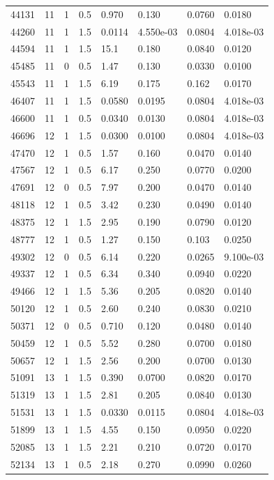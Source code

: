 \documentclass[preview]{standalone}
\begin{document}
{{{{{\begin{tabular}{L{1.2cm}C{1.2cm} C{0.3cm}C{0.5cm} C{1.4cm}C{1.4cm} C{1.4cm}C{1.4cm}}
  44131  &    11  & 1     & 0.5 &  0.970  & 0.130  & 0.0760 &  0.0180   \\ 
  44260  &    11  & 1     & 1.5 &  0.0114  & 4.550e-03  & 0.0804 &  4.018e-03   \\ 
  44594  &    11  & 1     & 1.5 &  15.1  & 0.180  & 0.0840 &  0.0120   \\ 
  45485  &    11  & 0     & 0.5 &  1.47  & 0.130  & 0.0330 &  0.0100   \\ 
  45543  &    11  & 1     & 1.5 &  6.19  & 0.175  & 0.162 &  0.0170   \\ 
  46407  &    11  & 1     & 1.5 &  0.0580  & 0.0195  & 0.0804 &  4.018e-03   \\ 
  46600  &    11  & 1     & 0.5 &  0.0340  & 0.0130  & 0.0804 &  4.018e-03   \\ 
  46696  &    12  & 1     & 1.5 &  0.0300  & 0.0100  & 0.0804 &  4.018e-03   \\ 
  47470  &    12  & 1     & 0.5 &  1.57  & 0.160  & 0.0470 &  0.0140   \\ 
  47567  &    12  & 1     & 0.5 &  6.17  & 0.250  & 0.0770 &  0.0200   \\ 
  47691  &    12  & 0     & 0.5 &  7.97  & 0.200  & 0.0470 &  0.0140   \\ 
  48118  &    12  & 1     & 0.5 &  3.42  & 0.230  & 0.0490 &  0.0140   \\ 
  48375  &    12  & 1     & 1.5 &  2.95  & 0.190  & 0.0790 &  0.0120   \\ 
  48777  &    12  & 1     & 0.5 &  1.27  & 0.150  & 0.103 &  0.0250   \\ 
  49302  &    12  & 0     & 0.5 &  6.14  & 0.220  & 0.0265 &  9.100e-03   \\ 
  49337  &    12  & 1     & 0.5 &  6.34  & 0.340  & 0.0940 &  0.0220   \\ 
  49466  &    12  & 1     & 1.5 &  5.36  & 0.205  & 0.0820 &  0.0140   \\ 
  50120  &    12  & 1     & 0.5 &  2.60  & 0.240  & 0.0830 &  0.0210   \\ 
  50371  &    12  & 0     & 0.5 &  0.710  & 0.120  & 0.0480 &  0.0140   \\ 
  50459  &    12  & 1     & 0.5 &  5.52  & 0.280  & 0.0700 &  0.0180   \\ 
  50657  &    12  & 1     & 1.5 &  2.56  & 0.200  & 0.0700 &  0.0130   \\ 
  51091  &    13  & 1     & 1.5 &  0.390  & 0.0700  & 0.0820 &  0.0170   \\ 
  51319  &    13  & 1     & 1.5 &  2.81  & 0.205  & 0.0840 &  0.0130   \\ 
  51531  &    13  & 1     & 1.5 &  0.0330  & 0.0115  & 0.0804 &  4.018e-03   \\ 
  51899  &    13  & 1     & 1.5 &  4.55  & 0.150  & 0.0950 &  0.0220   \\ 
  52085  &    13  & 1     & 1.5 &  2.21  & 0.210  & 0.0720 &  0.0170   \\ 
  52134  &    13  & 1     & 0.5 &  2.18  & 0.270  & 0.0990 &  0.0260   \\ 
\hline 
\end{tabular} 

}}}}}
\end{document}

